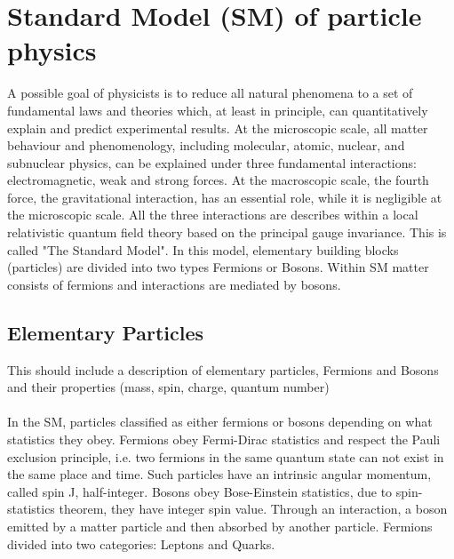 \section{Standard Model (SM) of particle physics}
\label{chap1:SM}
A possible goal of physicists is to reduce all natural phenomena to a set of fundamental laws and theories which, at least in principle, can quantitatively explain and predict experimental results. At the microscopic scale, all matter behaviour and phenomenology, including molecular, atomic, nuclear, and subnuclear physics, can be explained under three fundamental interactions: electromagnetic, weak and strong forces. At the macroscopic scale, the fourth force, the gravitational interaction, has an essential role, while it is negligible at the microscopic scale. All the three interactions are describes within a local relativistic quantum field theory based on the principal gauge invariance. This is called "The Standard Model". In this model, elementary building blocks (particles) are divided into two types Fermions or Bosons. Within SM matter consists of fermions and interactions are mediated by bosons. 

\subsection{Elementary Particles}
\label{chap1:SM:EP}

This should include a description of elementary particles, Fermions and  Bosons and their properties (mass, spin, charge, quantum number)
\\
\\
In the SM, particles classified as either fermions or bosons depending on what statistics they obey. Fermions obey Fermi-Dirac statistics and respect the Pauli exclusion principle, i.e. two fermions in the same quantum state can not exist in the same place and time. Such particles have an intrinsic angular momentum, called spin J, half-integer. Bosons obey Bose-Einstein statistics, due to spin-statistics theorem, they have integer spin value. Through an interaction, a boson emitted by a matter particle and then absorbed by another particle. Fermions divided into two categories: Leptons and Quarks.
